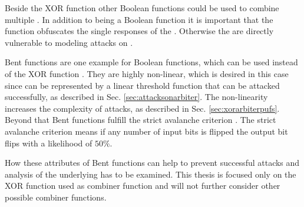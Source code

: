 Beside the \ac{XOR} function other Boolean functions could be used to combine multiple \apuf.
In addition to being a Boolean function it is important that the function obfuscates the single responses of the \apufs. Otherwise the \apufs are directly vulnerable to modeling attacks on \apufs.

Bent functions are one example for Boolean functions, which can be used instead of the \ac{XOR} function \cite{2016BentFunction}.
They are highly non-linear, which is desired in this case since \apufs can be represented by a linear threshold function that can be attacked successfully, as described in Sec. \ref{sec:attacksonarbiter}.
The non-linearity increases the complexity of attacks, as described in Sec. \ref{sec:xorarbiterpufs}.\\
Beyond that Bent functions fulfill the strict avalanche criterion \cite{2016AvalancheEffect}.
The strict avalanche criterion means if any number of input bits is flipped the output bit flips with a likelihood of $50 \%$.

How these attributes of Bent functions can help to prevent successful attacks and analysis of the underlying \apufs has to be examined.
This thesis is focused only on the \ac{XOR} function used as combiner function and will not further consider other possible combiner functions.

